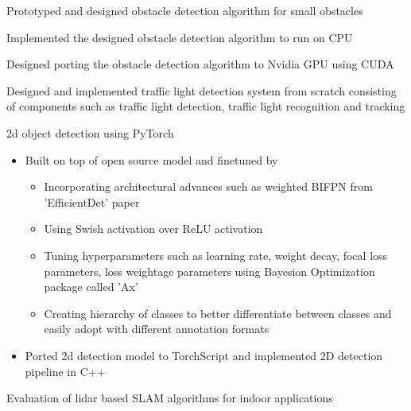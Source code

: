 \documentclass[]{deedy-resume-openfont}
\begin{document}
\begin{minipage}[t]{0.69\textwidth}
\vspace{\topsep} %
\begin{tightemize}
\item Prototyped and designed obstacle detection algorithm for small obstacles
\item Implemented the designed obstacle detection algorithm to run on CPU
\item Designed porting the obstacle detection algorithm to Nvidia GPU using CUDA
\end{tightemize}
\sectionsep

\vspace{\topsep} %
\begin{tightemize}
\item Designed and implemented traffic light detection system from scratch consisting of components such as traffic light detection, traffic light recognition and tracking
\item 2d object detection using PyTorch
    \begin{itemize}
        \item Built on top of open source model and finetuned by
            \begin{itemize}
                \item Incorporating architectural advances such as weighted BIFPN from 'EfficientDet' paper
                \item Using Swish activation over ReLU activation
                \item Tuning hyperparameters such as learning rate, weight decay, focal loss parameters, loss weightage parameters using Bayesion Optimization package called 'Ax'
                \item Creating hierarchy of classes to better differentiate between classes and easily adopt with different annotation formats
            \end{itemize}
        \item Ported 2d detection model to TorchScript and implemented 2D detection pipeline in C++
    \end{itemize}
\item Evaluation of lidar based SLAM algorithms for indoor applications

\end{tightemize}
\end{minipage}
\end{document}
